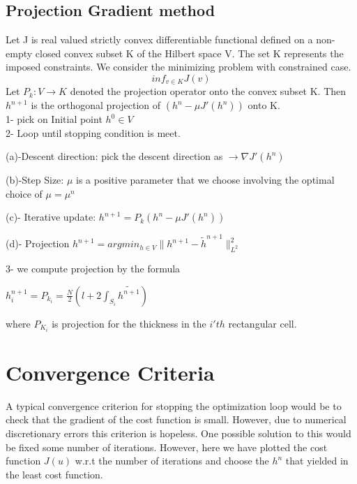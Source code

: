 \documentclass[paper=a4, fontsize=11pt]{scrartcl}
\numberwithin{equation}{section}		%
\numberwithin{figure}{section}			%
\numberwithin{table}{section}				%
\begin{document}
\subsection{Projection Gradient method}
Let J is real valued strictly convex differentiable functional defined on a non-empty closed convex subset K of the Hilbert space V. The set K represents the imposed constraints.
We consider the minimizing problem with constrained case.
\begin{equation}
inf_{v \in K} J(v)
\end{equation} 
Let $P_{k}:V \rightarrow K$ denoted the projection operator onto the convex subset K. Then $h^{n+1}$ is the orthogonal projection of $(h^{n} - \mu J'(h^{n}))$ onto K.\\
1- pick on Initial point $h^{0} \in V$ \\
2- Loop until stopping condition is meet.
\begin{description}
  \item
 (a)-Descent direction: pick the descent direction as $\rightarrow \nabla J'(h^{n})$
  \item
(b)-Step Size: $\mu$ is a positive parameter that we choose involving the optimal choice of $\mu = \mu^{n}$
  \item
(c)- Iterative update: $h^{n+1} = P_{k}(h^{n} - \mu J'(h^{n}))$
 \item
 (d)- Projection  $ h^{n+1} = arg min_{h \in V} \| h^{n+1} - \tilde{h}^{n+1} \|^2_{L^2}$

\end{description}
3- we compute projection by the formula 

\begin{center}
$h^{n+1}_{i} = P_{k_{i}} = \frac{N}{2}( l + 2 \int_{S_{i}} \tilde{h^{n+1}})$
\end{center}
where $P_{K_{i}}$ is projection for the thickness in the $i'th$ rectangular cell.
\section{Convergence Criteria}
A typical convergence criterion for stopping the optimization loop would be to check that the gradient of the cost function is small. However, due to numerical discretionary errors this criterion is hopeless. One possible solution to this would be fixed some number of iterations. However, here we have plotted the cost function $J(u)$ w.r.t the number of iterations and choose the $h^n$ that yielded in the least cost function.
\end{document}
